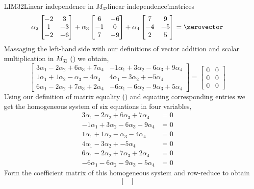 \begin{example}{LIM32}{Linear independence in $M_{32}$}{linear independence!matrices}
\begin{equation*}
\alpha_2\begin{bmatrix}
-2 & 3\\1 & -3\\-2 & -6
\end{bmatrix}+
\alpha_3\begin{bmatrix}
6 & -6\\-1 & 0\\7 & -9
\end{bmatrix}+
\alpha_4\begin{bmatrix}
7 & 9\\-4 & -5\\2 & 5
\end{bmatrix}=
\zerovector
\end{equation*}
%
Massaging the left-hand side with our definitions of vector addition and scalar multiplication in $M_{32}$ () we obtain,
%
\begin{equation*}
\begin{bmatrix}
3\alpha_1-2\alpha_2+6\alpha_3+7\alpha_4 &
-1\alpha_1+3\alpha_2-6\alpha_3+9\alpha_4 \\
1\alpha_1+1\alpha_2-\alpha_3-4\alpha_4 &
4\alpha_1-3\alpha_2+            -5\alpha_4 \\
6\alpha_1-2\alpha_2+7\alpha_3+2\alpha_4 &
-6\alpha_1-6\alpha_2-9\alpha_3+5\alpha_4
\end{bmatrix}
=\begin{bmatrix}
0&0\\0&0\\0&0
\end{bmatrix}
\end{equation*}
%
Using our definition of matrix equality () and equating corresponding entries we get the homogeneous system of six equations in four variables,
%
\begin{align*}
3\alpha_1-2\alpha_2+6\alpha_3+7\alpha_4&=0\\
-1\alpha_1+3\alpha_2-6\alpha_3+9\alpha_4&=0\\
1\alpha_1+1\alpha_2-\alpha_3-4\alpha_4&=0\\
4\alpha_1-3\alpha_2+            -5\alpha_4&=0\\
6\alpha_1-2\alpha_2+7\alpha_3+2\alpha_4&=0\\
-6\alpha_1-6\alpha_2-9\alpha_3+5\alpha_4&=0
\end{align*}
%
Form the coefficient matrix of this homogeneous system and row-reduce to obtain
%
\begin{equation*}
\begin{bmatrix}

\end{bmatrix}
\end{equation*}
\end{example}
